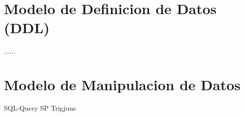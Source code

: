 \section{Modelo de Definicion de Datos (DDL)}

......

\section{Modelo de Manipulacion de Datos}

SQL-Query
SP
Trigjuns
